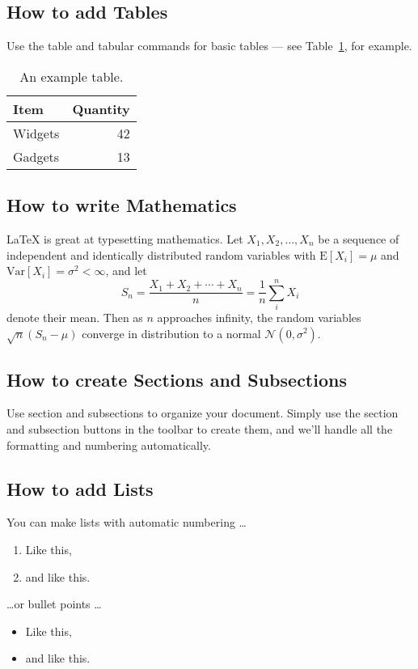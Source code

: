 \documentclass[a4paper]{article}
\begin{document}
    \subsection{How to add Tables}

    Use the table and tabular commands for basic tables --- see Table~\ref{tab:widgets}, for example.

    \begin{table}
    \centering
    \begin{tabular}{l|r}
    Item & Quantity \\\hline
    Widgets & 42 \\
    Gadgets & 13
    \end{tabular}
    \caption{\label{tab:widgets}An example table.}
    \end{table}

    \subsection{How to write Mathematics}

    \LaTeX{} is great at typesetting mathematics. Let $X_1, X_2, \ldots, X_n$ be a sequence of independent and identically distributed random variables with $\text{E}[X_i] = \mu$ and $\text{Var}[X_i] = \sigma^2 < \infty$, and let
    \[S_n = \frac{X_1 + X_2 + \cdots + X_n}{n}
          = \frac{1}{n}\sum_{i}^{n} X_i\]
    denote their mean. Then as $n$ approaches infinity, the random variables $\sqrt{n}(S_n - \mu)$ converge in distribution to a normal $\mathcal{N}(0, \sigma^2)$.


    \subsection{How to create Sections and Subsections}

    Use section and subsections to organize your document. Simply use the section and subsection buttons in the toolbar to create them, and we'll handle all the formatting and numbering automatically.

    \subsection{How to add Lists}

    You can make lists with automatic numbering \dots

    \begin{enumerate}
    \item Like this,
    \item and like this.
    \end{enumerate}
    \dots or bullet points \dots
    \begin{itemize}
    \item Like this,
    \item and like this.
    \end{itemize}
\end{document}
